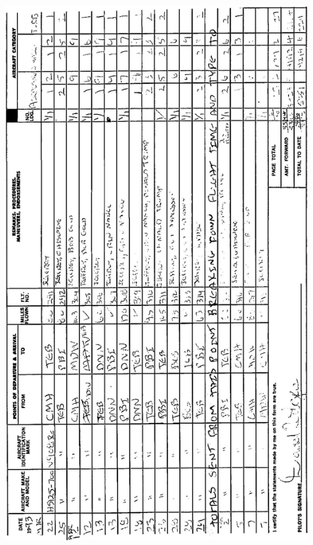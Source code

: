 \documentclass[10pt]{article}
\begin{document}
\includegraphics[max width=\textwidth, center]{2025_02_27_dd68c3d38de88f0516d9g-022}\\
\end{document}
